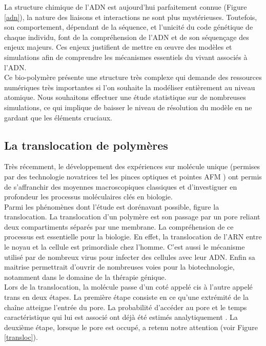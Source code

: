 \documentclass[a4paper,11pt]{article}
\begin{document}
La structure chimique de l'ADN est aujourd'hui parfaitement connue (Figure \ref{adn}), la nature des liaisons et interactions ne sont plus mystérieuses. Toutefois, son comportement, dépendant de la séquence, et l'unicité du code génétique de chaque individu,  font de la compréhension de l'ADN et de son séquençage des enjeux majeurs. Ces enjeux justifient de mettre en œuvre des modèles et simulations afin de comprendre les mécanismes essentiels du vivant associés à l'ADN.\\

Ce bio-polymère présente une structure très complexe qui demande des ressources numériques très importantes si l'on souhaite la modéliser entièrement au niveau atomique. Nous souhaitons effectuer une étude statistique sur de nombreuses simulations, ce qui implique de baisser le niveau de résolution du modèle en ne gardant que les éléments cruciaux.

  

\subsection{La translocation de polymères}
Très récemment, le développement des expériences sur molécule unique (permises par des technologie novatrices tel les pinces optiques et pointes AFM \cite{keyser}) ont permis de s'affranchir des moyennes macroscopiques classiques et d'investiguer en profondeur les processus moléculaires clés en biologie.\\

Parmi les phénomènes dont l'étude est dorénavant possible, figure la translocation. La translocation d'un polymère est son passage par un pore reliant deux compartiments séparés par une membrane. La compréhension de ce processus est essentielle pour la biologie. En effet, la translocation de l'ARN entre le noyau et la cellule est primordiale chez l'homme. C'est aussi le mécanisme utilisé par de nombreux virus pour infecter des cellules avec leur ADN. Enfin sa maitrise permettrait d'ouvrir de nombreuses voies pour la biotechnologie, notamment dans le domaine de la thérapie génique.\\

 Lors de la translocation, la molécule passe d'un coté appelé cis à l'autre appelé trans en deux étapes. La première étape consiste en ce qu'une extrémité de la chaîne atteigne l'entrée du pore. La probabilité d'accéder au pore et le temps caractéristique qui lui est associé ont déjà été estimés analytiquement \cite{milchev}. La deuxième étape, lorsque le pore est occupé, a retenu notre attention (voir Figure \ref{transloc}). \\
\end{document}
